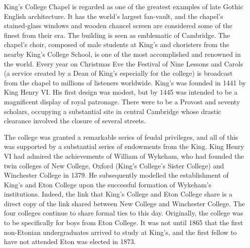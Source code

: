 \documentclass{report}
\begin{document}


King's College Chapel is regarded as one of the greatest examples of late Gothic English architecture. It has the world's largest fan-vault, and the chapel's stained-glass windows and wooden chancel screen are considered some of the finest from their era. The building is seen as emblematic of Cambridge. The chapel's choir, composed of male students at King's and choristers from the nearby King's College School, is one of the most accomplished and renowned in the world. Every year on Christmas Eve the Festival of Nine Lessons and Carols (a service created by a Dean of King's especially for the college) is broadcast from the chapel to millions of listeners worldwide. King's was founded in 1441 by King Henry VI. His first design was modest, but by 1445 was intended to be a magnificent display of royal patronage. There were to be a Provost and seventy scholars, occupying a substantial site in central Cambridge whose drastic clearance involved the closure of several streets. 

The college was granted a remarkable series of feudal privileges, and all of this was supported by a substantial series of endowments from the King. King Henry VI had admired the achievements of William of Wykeham, who had founded the twin colleges of New College, Oxford (King's College's Sister College) and Winchester College in 1379. He subsequently modelled the establishment of King's and Eton College upon the successful formation of Wykeham's institutions. Indeed, the link that King's College and Eton College share is a direct copy of the link shared between New College and Winchester College. The four colleges continue to share formal ties to this day. Originally, the college was to be specifically for boys from Eton College. It was not until 1865 that the first non-Etonian undergraduates arrived to study at King's, and the first fellow to have not attended Eton was elected in 1873. \\

\end{document}
